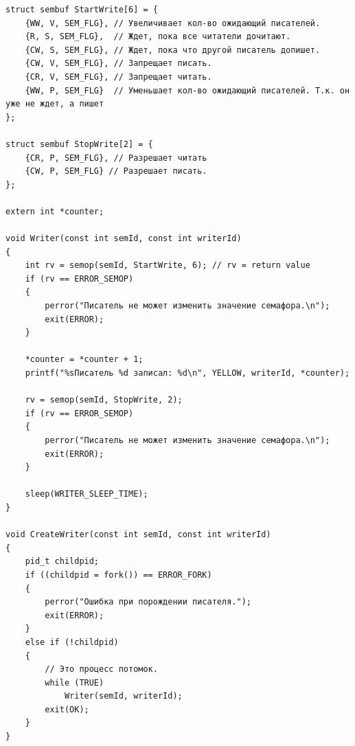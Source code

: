 \begin{lstlisting}[label=some-code,caption=Писатель]
struct sembuf StartWrite[6] = {
	{WW, V, SEM_FLG}, // Увеличивает кол-во ожидающий писателей.
	{R, S, SEM_FLG},  // Ждет, пока все читатели дочитают.
	{CW, S, SEM_FLG}, // Ждет, пока что другой писатель допишет.
	{CW, V, SEM_FLG}, // Запрещает писать.
	{CR, V, SEM_FLG}, // Запрещает читать.
	{WW, P, SEM_FLG}  // Уменьшает кол-во ожидающий писателей. Т.к. он уже не ждет, а пишет
};

struct sembuf StopWrite[2] = {
	{CR, P, SEM_FLG}, // Разрешает читать
	{CW, P, SEM_FLG} // Разрешает писать.
};

extern int *counter;

void Writer(const int semId, const int writerId)
{
	int rv = semop(semId, StartWrite, 6); // rv = return value
	if (rv == ERROR_SEMOP)
	{
		perror("Писатель не может изменить значение семафора.\n");
		exit(ERROR);
	}

	*counter = *counter + 1;
	printf("%sПисатель %d записал: %d\n", YELLOW, writerId, *counter);

	rv = semop(semId, StopWrite, 2);
	if (rv == ERROR_SEMOP)
	{
		perror("Писатель не может изменить значение семафора.\n");
		exit(ERROR);
	}

	sleep(WRITER_SLEEP_TIME);
}

void CreateWriter(const int semId, const int writerId)
{
	pid_t childpid;
	if ((childpid = fork()) == ERROR_FORK)
	{
		perror("Ошибка при порождении писателя.");
		exit(ERROR);
	}
	else if (!childpid)
	{
		// Это процесс потомок.
		while (TRUE)
			Writer(semId, writerId);
		exit(OK);
	}
}
\end{lstlisting}


\begin{figure}[ht!]
\end{figure}

